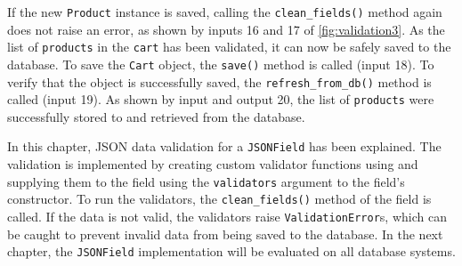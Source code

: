 If the new \verb|Product| instance is saved, calling the \verb|clean_fields()|
method again does not raise an error, as shown by inputs 16 and 17 of
\autoref{fig:validation3}. As the list of \verb|products| in the \verb|cart|
has been validated, it can now be safely saved to the database. To save the
\verb|Cart| object, the \verb|save()| method is called (input 18). To verify
that the object is successfully saved, the \verb|refresh_from_db()| method is
called (input 19). As shown by input and output 20, the list of \verb|products|
were successfully stored to and retrieved from the database.

In this chapter, JSON data validation for a \verb|JSONField| has been
explained. The validation is implemented by creating custom validator functions
using and supplying them to the field using the \verb|validators| argument to
the field's constructor. To run the validators, the \verb|clean_fields()|
method of the field is called. If the data is not valid, the validators raise
\verb|ValidationError|s, which can be caught to prevent invalid data from being
saved to the database. In the next chapter, the \verb|JSONField| implementation
will be evaluated on all database systems.

